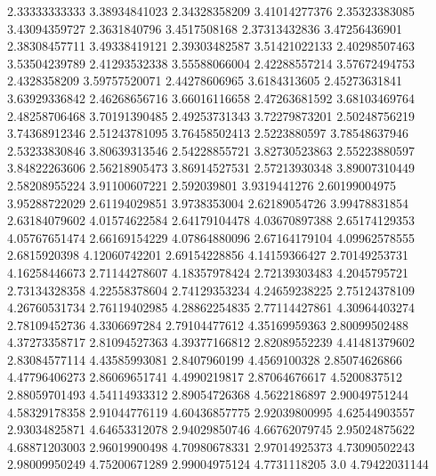   2.33333333333    3.38934841023
  2.34328358209    3.41014277376
  2.35323383085    3.43094359727
   2.3631840796     3.4517508168
  2.37313432836    3.47256436901
  2.38308457711    3.49338419121
  2.39303482587    3.51421022133
  2.40298507463    3.53504239789
  2.41293532338    3.55588066004
  2.42288557214    3.57672494753
   2.4328358209    3.59757520071
  2.44278606965     3.6184313605
  2.45273631841    3.63929336842
  2.46268656716    3.66016116658
  2.47263681592    3.68103469764
  2.48258706468    3.70191390485
  2.49253731343    3.72279873201
  2.50248756219    3.74368912346
  2.51243781095    3.76458502413
   2.5223880597    3.78548637946
  2.53233830846    3.80639313546
  2.54228855721    3.82730523863
  2.55223880597    3.84822263606
  2.56218905473    3.86914527531
  2.57213930348    3.89007310449
  2.58208955224    3.91100607221
    2.592039801     3.9319441276
  2.60199004975    3.95288722029
  2.61194029851     3.9738353004
  2.62189054726    3.99478831854
  2.63184079602    4.01574622584
  2.64179104478    4.03670897388
  2.65174129353    4.05767651474
  2.66169154229    4.07864880096
  2.67164179104    4.09962578555
   2.6815920398    4.12060742201
  2.69154228856    4.14159366427
  2.70149253731    4.16258446673
  2.71144278607    4.18357978424
  2.72139303483     4.2045795721
  2.73134328358    4.22558378604
  2.74129353234    4.24659238225
  2.75124378109    4.26760531734
  2.76119402985    4.28862254835
  2.77114427861    4.30964403274
  2.78109452736     4.3306697284
  2.79104477612    4.35169959363
  2.80099502488    4.37273358717
  2.81094527363    4.39377166812
  2.82089552239    4.41481379602
  2.83084577114    4.43585993081
   2.8407960199     4.4569100328
  2.85074626866    4.47796406273
  2.86069651741     4.4990219817
  2.87064676617     4.5200837512
  2.88059701493    4.54114933312
  2.89054726368     4.5622186897
  2.90049751244    4.58329178358
  2.91044776119    4.60436857775
  2.92039800995    4.62544903557
  2.93034825871    4.64653312078
  2.94029850746    4.66762079745
  2.95024875622    4.68871203003
  2.96019900498    4.70980678331
  2.97014925373    4.73090502243
  2.98009950249    4.75200671289
  2.99004975124     4.7731118205
            3.0    4.79422031144
